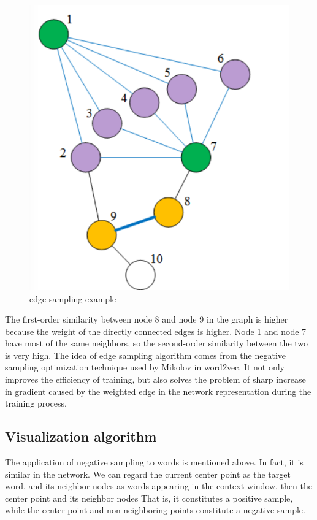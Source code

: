\begin{figure}[ht]

\centering
\includegraphics[width=12cm,height=7cm\textwidth]{images/image_largevis_line_1.PNG}
\caption{edge sampling example}
\label{fig:label}
\end{figure}


\noindent The first-order similarity between node 8 and node 9 in the graph is higher because the weight of the directly connected edges is higher. Node 1 and node 7 have most of the same neighbors, so the second-order similarity between the two is very high. The idea of edge sampling algorithm comes from the negative sampling optimization technique used by Mikolov in word2vec. It not only improves the efficiency of training, but also solves the problem of sharp increase in gradient caused by the weighted edge in the network representation during the training process.\\

\subsection{Visualization algorithm}

\noindent The application of negative sampling to words is mentioned above. In fact, it is similar in the network. We can regard the current center point as the target word, and its neighbor nodes as words appearing in the context window, then the center point and its neighbor nodes That is, it constitutes a positive sample, while the center point and non-neighboring points constitute a negative sample.

